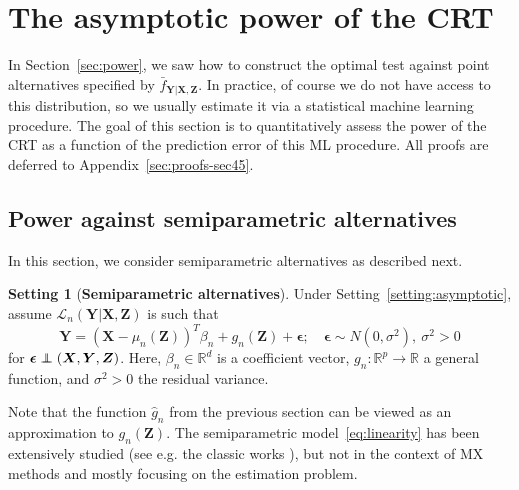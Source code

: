 \documentclass[12pt]{article}
\theoremstyle{definition}
\newtheorem{setting}{Setting}
\theoremstyle{remark}
\def\independenT#1#2{\mathrel{\rlap{$#1#2$}\mkern2mu{#1#2}}}
\newcommand\independent{\protect\mathpalette{\protect\independenT}{\perp}}
\newcommand{\prx}{\bm X}
\newcommand{\prz}{\bm Z}
\newcommand{\pry}{{\bm Y}}
\newcommand{\peps}{\bm \epsilon}
\begin{document}
\clearpage

\section{The asymptotic power of the CRT} \label{sec:asymptotic-power}

In Section~\ref{sec:power}, we saw how to construct the optimal test against point alternatives specified by $\bar f_{\pry|\prx,\prz}$. In practice, of course we do not have access to this distribution, so we usually estimate it via a statistical machine learning procedure. The goal of this section is to quantitatively assess the power of the CRT as a function of the prediction error of this ML procedure. All proofs are deferred to Appendix~\ref{sec:proofs-sec45}.

\subsection{Power against semiparametric alternatives} \label{sec:power-results}

In this section, we consider semiparametric alternatives as described next.

\begin{setting}[\bf Semiparametric alternatives] \label{setting:semiparametric}
Under Setting~\ref{setting:asymptotic}, assume $\mathcal L_n(\pry|\prx,\prz)$ is such that
\begin{equation}
	\pry = (\prx-\mu_n(\prz))^T \beta_n + g_n(\prz) + \peps; \quad \peps \sim N(0, \sigma^2 ),\ \sigma^2 > 0
	\label{eq:linearity}
\end{equation}
for $\peps \independent (\prx, \pry, \prz)$. Here, $\beta_n \in \mathbb R^d$ is a coefficient vector, $g_n: \mathbb R^p \rightarrow \mathbb R$ a general function, and $\sigma^2 > 0$ the residual variance. 
\end{setting}

Note that the function $\widehat g_n$ from the previous section can be viewed as an approximation to $g_n(\prz)$. The semiparametric model~\eqref{eq:linearity} has been extensively studied (see e.g. the classic works \cite{Robinson1988, Robins1992}), but not in the context of MX methods and mostly focusing on the estimation problem. 
\end{document}

